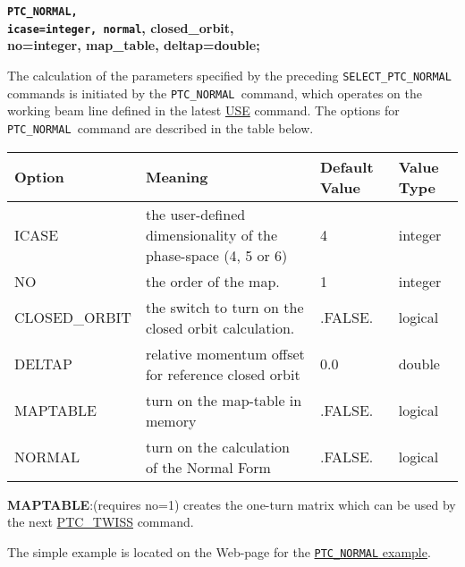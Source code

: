 \begin{description}
	\item {\texttt{\textbf{\textbf{PTC\_NORMAL, 
\\   icase=}integer, }}\textbf{\texttt{normal}, \textbf{closed\_orbit}, \textbf{
\\   no}=integer,         \textbf{map\_table, deltap}=double\textbf{;}}}

	\item[Description] 

    The calculation of the parameters            specified by the preceding \texttt{SELECT\_PTC\_NORMAL }           commands is initiated by the \texttt{PTC\_NORMAL }command,            which operates on the working beam line defined in the latest           \href{../control/general.html#use}{           USE} command. The options for \texttt{           PTC\_NORMAL }command are            described in the table below. 
	\item[Options] 
	\text{ \\} %
	
\begin{tabular}{l p{5cm} p{2cm} p{2cm}}
\hline 
\textbf{Option} & \textbf{Meaning} & \textbf{Default Value} & \textbf{Value Type} \\ 
\hline
ICASE & the user-defined dimensionality of the phase-space (4, 5 or 6) & 4 & integer \\ 
\hline
NO & the order of the map. & 1 & integer \\ 
\hline
CLOSED\_ORBIT & the switch to turn on the closed orbit calculation. & .FALSE. & logical \\ 
\hline
DELTAP & relative momentum offset for reference closed orbit & 0.0 & double \\ 
\hline
MAPTABLE & turn on the map-table in memory & .FALSE. & logical \\ 
\hline
NORMAL & turn on the calculation of the Normal Form & .FALSE. & logical \\ 
\hline
\end{tabular}

	\item[Remarks] 
	\text{ \\}

\textbf{MAPTABLE}:\nolinebreak(requires no=1) creates the one-turn matrix which            can be used by the next           \href{../ptc_twiss/ptc_twiss.html}{           PTC\_TWISS} command.
	\item[Example]
	\text{ \\}	
		
	 The simple example is located on the Web-page for the              \href{http://cern.ch/frs/mad-X_examples/ptc_normal}{\texttt{PTC\_NORMAL} example}.
\end{description}
